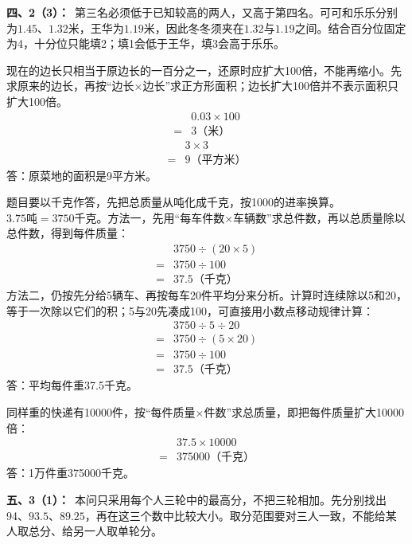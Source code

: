 \documentclass[multi=snippet,border=0pt]{standalone}
\newenvironment{snippet}[3]{\begin{minipage}{#1bp}\color{answerred}\fontsize{#2}{#3}\selectfont\raggedright}{\end{minipage}}
\begin{document}
\begin{snippet}{505}{11.5}{14}\textbf{四、2（3）：}\ 第三名必须低于已知较高的两人，又高于第四名。可可和乐乐分别为\(1.45\)、\(1.32\)米，王华为\(1.19\)米，因此冬冬须夹在\(1.32\)与\(1.19\)之间。结合百分位固定为4，十分位只能填2；填1会低于王华，填3会高于乐乐。\end{snippet}
\begin{snippet}{505}{11.5}{14}现在的边长只相当于原边长的一百分之一，还原时应扩大100倍，不能再缩小。先求原来的边长，再按“边长×边长”求正方形面积；边长扩大100倍并不表示面积只扩大100倍。\[\begin{aligned}&0.03\times100\\={}&3\text{（米）}\end{aligned}\]\[\begin{aligned}&3\times3\\={}&9\text{（平方米）}\end{aligned}\]答：原菜地的面积是9平方米。\end{snippet}
\begin{snippet}{505}{11.5}{14}题目要以千克作答，先把总质量从吨化成千克，按1000的进率换算。\(3.75\text{吨}=3750\text{千克}\)。方法一，先用“每车件数×车辆数”求总件数，再以总质量除以总件数，得到每件质量：\[\begin{aligned}&3750\div(20\times5)\\={}&3750\div100\\={}&37.5\text{（千克）}\end{aligned}\]方法二，仍按先分给5辆车、再按每车20件平均分来分析。计算时连续除以5和20，等于一次除以它们的积；5与20先凑成100，可直接用小数点移动规律计算：\[\begin{aligned}&3750\div5\div20\\={}&3750\div(5\times20)\\={}&3750\div100\\={}&37.5\text{（千克）}\end{aligned}\]答：平均每件重37.5千克。\par 同样重的快递有10000件，按“每件质量×件数”求总质量，即把每件质量扩大10000倍：\[\begin{aligned}&37.5\times10000\\={}&375000\text{（千克）}\end{aligned}\]答：1万件重375000千克。\end{snippet}
\begin{snippet}{505}{11.5}{14}\textbf{五、3（1）：}\ 本问只采用每个人三轮中的最高分，不把三轮相加。先分别找出94、\(93.5\)、\(89.25\)，再在这三个数中比较大小。取分范围要对三人一致，不能给某人取总分、给另一人取单轮分。\end{snippet}
\end{document}
